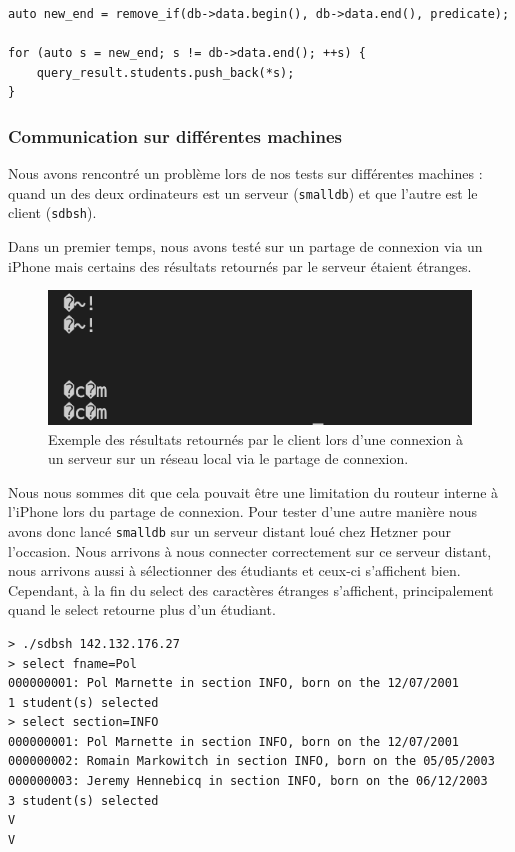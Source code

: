 \documentclass[utf8]{article}
\begin{document}
\begin{lstlisting}
auto new_end = remove_if(db->data.begin(), db->data.end(), predicate);

for (auto s = new_end; s != db->data.end(); ++s) {
	query_result.students.push_back(*s);
}
\end{lstlisting}

\subsubsection{Communication sur différentes machines}

Nous avons rencontré un problème lors de nos tests sur différentes machines : quand un des deux ordinateurs est un serveur (\texttt{smalldb}) et que l'autre est le client (\texttt{sdbsh}).

Dans un premier temps, nous avons testé sur un partage de connexion via un iPhone mais certains des résultats retournés par le serveur étaient étranges.

\begin{figure}[ht]
	\includegraphics[scale=0.6]{assets/char-iphone.png}
	\caption{Exemple des résultats retournés par le client lors d'une connexion à un serveur sur un réseau local via le partage de connexion.}
	\label{fig:char_iphone}
\end{figure}

Nous nous sommes dit que cela pouvait être une limitation du routeur interne à l'iPhone lors du partage de connexion. Pour tester d'une autre manière nous avons donc lancé \texttt{smalldb} sur un serveur distant loué chez Hetzner pour l'occasion. Nous arrivons à nous connecter correctement sur ce serveur distant, nous arrivons aussi à sélectionner des étudiants et ceux-ci s'affichent bien. Cependant, à la fin du select des caractères étranges s'affichent, principalement quand le select retourne plus d'un étudiant.

\begin{lstlisting}
> ./sdbsh 142.132.176.27
> select fname=Pol
000000001: Pol Marnette in section INFO, born on the 12/07/2001
1 student(s) selected
> select section=INFO
000000001: Pol Marnette in section INFO, born on the 12/07/2001
000000002: Romain Markowitch in section INFO, born on the 05/05/2003
000000003: Jeremy Hennebicq in section INFO, born on the 06/12/2003
3 student(s) selected
V
V
\end{lstlisting}
\end{document}
